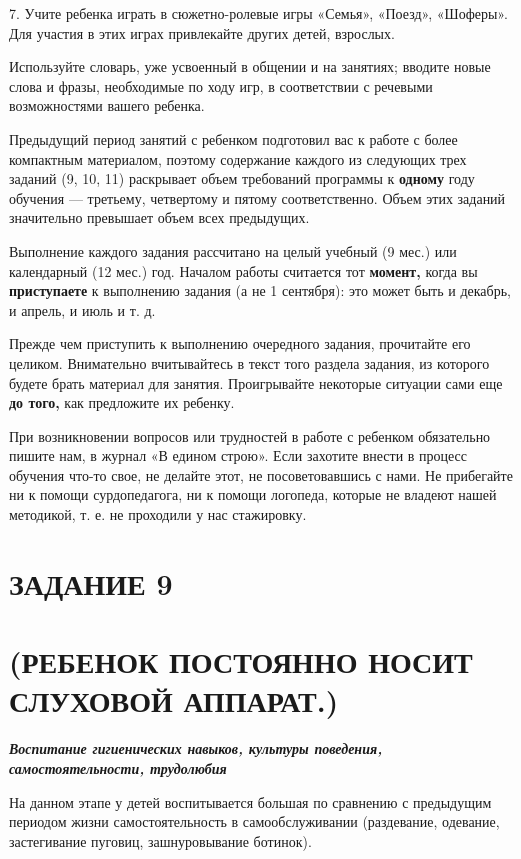 \documentclass[a5paper]{book}
\newcounter{structure}
\renewcommand{\emph}[1]{\textit{#1}}
\begin{document}
7. Учите ребенка играть в сюжетно-ролевые игры «Семья», «Поезд»,
«Шоферы». Для участия в этих играх привлекайте других детей, взрослых.

Используйте словарь, уже усвоенный в общении и на занятиях; вводите
новые слова и фразы, необходимые по ходу игр, в соответствии с речевыми
возможностями вашего ребенка.


Предыдущий период занятий с ребенком подготовил вас к работе с более
компактным материалом, поэтому содержание каждого из следующих трех
заданий (9, 10, 11) раскрывает объем требований программы к
\textbf{одному} году обучения --- третьему, четвертому и пятому
соответственно. Объем этих заданий значительно превышает объем всех
предыдущих.

Выполнение каждого задания рассчитано на целый учебный (9 мес.) или
календарный (12 мес.) год. Началом работы считается тот \textbf{момент,}
когда вы \textbf{приступаете} к выполнению задания (а не 1 сентября):
это может быть и декабрь, и апрель, и июль и т. д.

Прежде чем приступить к выполнению очередного задания, прочитайте его
целиком. Внимательно вчитывайтесь в текст того раздела задания, из
которого будете брать материал для занятия. Проигрывайте некоторые
ситуации сами еще \textbf{до того,} как предложите их ребенку.

При возникновении вопросов или трудностей в работе с ребенком
обязательно пишите нам, в журнал «В едином строю». Если захотите внести
в процесс обучения что-то свое, не делайте этот, не посоветовавшись с
нами. Не прибегайте ни к помощи сурдопедагога, ни к помощи логопеда,
которые не владеют нашей методикой, т. е. не проходили у нас стажировку.

\section{ЗАДАНИЕ 9}\section*{(РЕБЕНОК ПОСТОЯННО НОСИТ СЛУХОВОЙ АППАРАТ.)}

\emph{\textbf{Воспитание гигиенических навыков, культуры поведения,
самостоятельности, трудолюбия}}

На данном этапе у детей воспитывается большая по сравнению с предыдущим
периодом жизни самостоятельность в самообслуживании (раздевание,
одевание, застегивание пуговиц, зашнуровывание ботинок).
\end{document}
